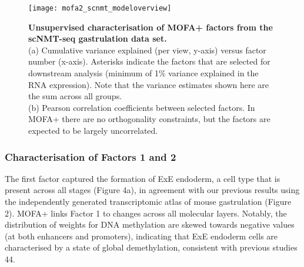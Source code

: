 \begin{figure}[H]
	\centering
	\texttt{[image: mofa2\_scnmt\_modeloverview]}
	\caption[]{
	\textbf{Unsupervised characterisation of MOFA+ factors from the scNMT-seq gastrulation data set.} \\
	(a) Cumulative variance explained (per view, y-axis) versus factor number (x-axis). Asterisks indicate the factors that are selected for downstream analysis (minimum of 1\% variance explained in the RNA expression). Note that the variance estimates shown here are the sum across all groups. \\
	(b) Pearson correlation coefficients between selected factors. In MOFA+ there are no orthogonality constraints, but the factors are expected to be largely uncorrelated.
	}
	\label{fig:mofa2_scnmt_modeloverview}
\end{figure}


\subsubsection{Characterisation of Factors 1 and 2}

The first factor captured the formation of ExE endoderm, a cell type that is present across all stages (Figure 4a), in agreement with our previous results using the independently generated transcriptomic atlas of mouse gastrulation (Figure 2). MOFA+ links Factor 1 to changes across all molecular layers. Notably, the distribution of weights for DNA methylation are skewed towards negative values (at both enhancers and promoters), indicating that ExE endoderm cells are characterised by a state of global demethylation, consistent with previous studies 44.

